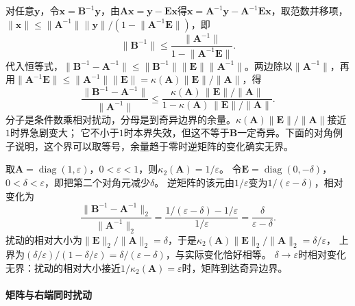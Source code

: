对任意$\bm y$，令$\bm x=\bm B^{-1}\bm y$，由$\bm A\bm x=\bm y-\bm E\bm x$得$\bm x=\bm A^{-1}\bm y-\bm A^{-1}\bm E\bm x$，取范数并移项，$\lVert\bm x\rVert\leq\lVert\bm A^{-1}\rVert\lVert\bm y\rVert/(1-\lVert\bm A^{-1}\bm E\rVert)$，即
\[
 \lVert\bm B^{-1}\rVert\leq\frac{\lVert\bm A^{-1}\rVert}{1-\lVert\bm A^{-1}\bm E\rVert}.
\]
代入恒等式，$\lVert\bm B^{-1}-\bm A^{-1}\rVert\leq\lVert\bm B^{-1}\rVert\lVert\bm E\rVert\lVert\bm A^{-1}\rVert$。两边除以$\lVert\bm A^{-1}\rVert$，再用$\lVert\bm A^{-1}\bm E\rVert\leq\lVert\bm A^{-1}\rVert\lVert\bm E\rVert=\kappa(\bm A)\lVert\bm E\rVert/\lVert\bm A\rVert$，得
\[
 \frac{\lVert\bm B^{-1}-\bm A^{-1}\rVert}
      {\lVert\bm A^{-1}\rVert}
 \leq
 \frac{\kappa(\bm A)\,\lVert\bm E\rVert/\lVert\bm A\rVert}
      {1-\kappa(\bm A)\,\lVert\bm E\rVert/\lVert\bm A\rVert}.
\]
分子是条件数乘相对扰动，分母是到奇异边界的余量。$\kappa(\bm A)\lVert\bm E\rVert/\lVert\bm A\rVert$接近$1$时界急剧变大；
它不小于$1$时本界失效，但这不等于$\bm B$一定奇异。下面的对角例子说明，这个界可以取等号，余量趋于零时逆矩阵的变化确实无界。

\begin{example}[接近奇异边界的对角矩阵]
\label{ex:ls-inverse-perturbation-diagonal}
取$\bm A=\operatorname{diag}(1,\varepsilon)$，$0<\varepsilon<1$，则$\kappa_2(\bm A)=1/\varepsilon$。
令$\bm E=\operatorname{diag}(0,-\delta)$，$0<\delta<\varepsilon$，即把第二个对角元减少$\delta$。
逆矩阵的该元由$1/\varepsilon$变为$1/(\varepsilon-\delta)$，相对变化为
\[
 \frac{\lVert\bm B^{-1}-\bm A^{-1}\rVert_2}{\lVert\bm A^{-1}\rVert_2}
 =\frac{1/(\varepsilon-\delta)-1/\varepsilon}{1/\varepsilon}
 =\frac{\delta}{\varepsilon-\delta}.
\]
扰动的相对大小为$\lVert\bm E\rVert_2/\lVert\bm A\rVert_2=\delta$，于是$\kappa_2(\bm A)\lVert\bm E\rVert_2/\lVert\bm A\rVert_2=\delta/\varepsilon$，
上界为$(\delta/\varepsilon)/(1-\delta/\varepsilon)=\delta/(\varepsilon-\delta)$，与实际变化恰好相等。
$\delta\to\varepsilon$时相对变化无界：扰动的相对大小接近$1/\kappa_2(\bm A)=\varepsilon$时，矩阵到达奇异边界。
\end{example}

\paragraph{矩阵与右端同时扰动}


